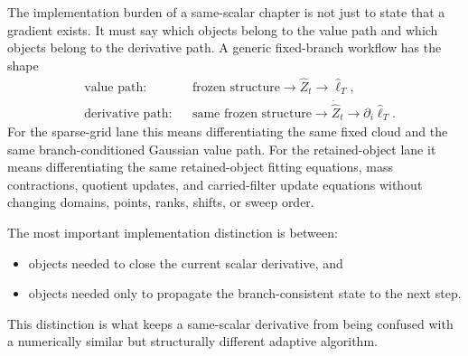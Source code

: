 The implementation burden of a same-scalar chapter is not just to state that a
gradient exists.  It must say which objects belong to the value path and which
objects belong to the derivative path.  A generic fixed-branch workflow has the
shape
\begin{equation}
\begin{aligned}
  &\text{value path:}
    &&\text{frozen structure} \to \widehat Z_t \to \widehat\ell_T,\\
  &\text{derivative path:}
    &&\text{same frozen structure} \to \dot{\widehat Z}_t \to
      \partial_i\widehat\ell_T.
\end{aligned}
  \label{eq:bf-hd-value-derivative-ledger}
\end{equation}
For the sparse-grid lane this means differentiating the same fixed cloud and the
same branch-conditioned Gaussian value path.  For the retained-object lane it
means differentiating the same retained-object fitting equations, mass
contractions, quotient updates, and carried-filter update equations without
changing domains, points, ranks, shifts, or sweep order.

The most important implementation distinction is between:
\begin{itemize}[leftmargin=0.28in]
  \item objects needed to close the current scalar derivative, and
  \item objects needed only to propagate the branch-consistent state to the next
  step.
\end{itemize}
This distinction is what keeps a same-scalar derivative from being confused with
a numerically similar but structurally different adaptive algorithm.

